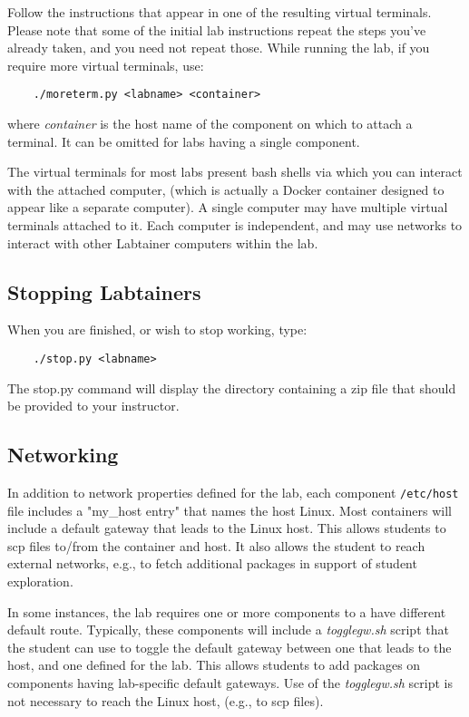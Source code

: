 \documentclass[12pt]{article}
\begin{document}
Follow the instructions that appear in one of the resulting virtual terminals.  Please
note that some of the initial lab instructions repeat the steps you've already taken, and you need
not repeat those.  While running the lab, if you require more virtual terminals, use:
\begin{verbatim}
    ./moreterm.py <labname> <container>
\end{verbatim}
\noindent where \textit{container} is the host name of the component on which to attach a terminal.  
It can be omitted for labs having a single component.

The virtual terminals for most labs present bash shells via which you can interact
with the attached computer, (which is actually a Docker container designed to appear
like a separate computer).  A single computer
may have multiple virtual terminals attached to it.  Each computer is independent, and 
may use networks to interact with other Labtainer computers within the lab.  

\subsection{Stopping Labtainers}
When you are finished, or wish to stop working, type:
\begin{verbatim}
    ./stop.py <labname>
\end{verbatim}
\noindent The stop.py command will display the directory containing a zip file that should be provided to your instructor.
\subsection{Networking}
In addition to network properties defined for the lab,
each component \texttt{/etc/host} file includes a "my\_host entry" that names
the host Linux.  Most containers will include a default gateway that
leads to the Linux host.  This allows students to scp files to/from the container and host.
It also allows the student to reach external networks, e.g., to fetch additional packages in
support of student exploration.

In some instances, the lab requires one or more components to a have different default route.
Typically, these components will include a \textit{togglegw.sh} script that the student
can use to toggle the default gateway between one that leads to the host, and one defined for the lab.
This allows students to add packages on components having lab-specific default gateways.
Use of the \textit{togglegw.sh} script is not necessary to reach the Linux host, (e.g., to scp files).
\end{document}
